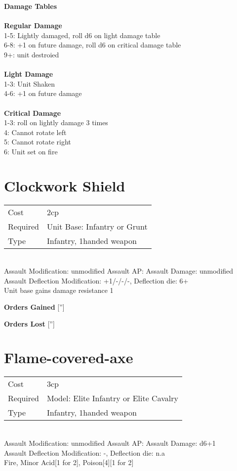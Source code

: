 {\bf Damage Tables} \\
\ \\ {\bf Regular Damage } \\
1-5: Lightly damaged, roll d6 on light damage table \\
6-8: +1 on future damage, roll d6 on critical damage table \\
9+: unit destroied \\
\ \\ {\bf Light Damage } \\
1-3: Unit Shaken \\
4-6: +1 on future damage \\
\ \\ {\bf Critical Damage  } \\
1-3: roll on lightly damage 3 times \\
4: Cannot rotate left \\
5: Cannot rotate right \\
6: Unit set on fire \\









\pagebreak\section{ Clockwork Shield }

\begin{tabular}{ll}
    Cost & 2cp \\
    Required & Unit Base: Infantry or Grunt\\
    Type & Infantry, 1handed weapon\\
\end{tabular}
\ \\
Assault Modification: unmodified Assault AP:  Assault Damage: unmodified\\
Assault Deflection Modification: +1/-/-/-, Deflection die: 6+ \\


Unit base gains damage resistance 1

{\bf Orders Gained}
['']

{\bf Orders Lost}
['']
\section{ Flame-covered-axe }

\begin{tabular}{ll}
    Cost & 3cp \\
    Required & Model: Elite Infantry or Elite Cavalry\\
    Type & Infantry, 1handed weapon\\
\end{tabular}
\ \\
Assault Modification: unmodified Assault AP:  Assault Damage: d6+1\\
Assault Deflection Modification: -, Deflection die: n.a \\
Fire, Minor Acid[1 for 2], Poison[4][1 for 2]



